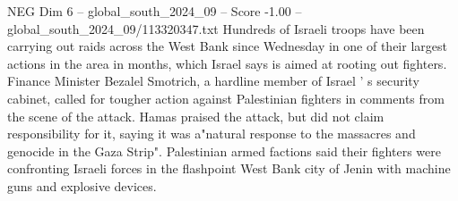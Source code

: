 \begin{textsample}{NEG Dim 6 – global\_south\_2024\_09 – Score -1.00 – global\_south\_2024\_09/113320347.txt}
Hundreds of Israeli troops have been carrying out raids across the West Bank since Wednesday in one of their largest actions in the area in months, which Israel says is aimed at rooting out fighters.
Finance Minister Bezalel Smotrich, a hardline member of Israel ' s security cabinet, called for tougher action against Palestinian fighters in comments from the scene of the attack.
Hamas praised the attack, but did not claim responsibility for it, saying it was a"natural response to the massacres and genocide in the Gaza Strip".
Palestinian armed factions said their fighters were confronting Israeli forces in the flashpoint West Bank city of Jenin with machine guns and explosive devices.

\end{textsample}
